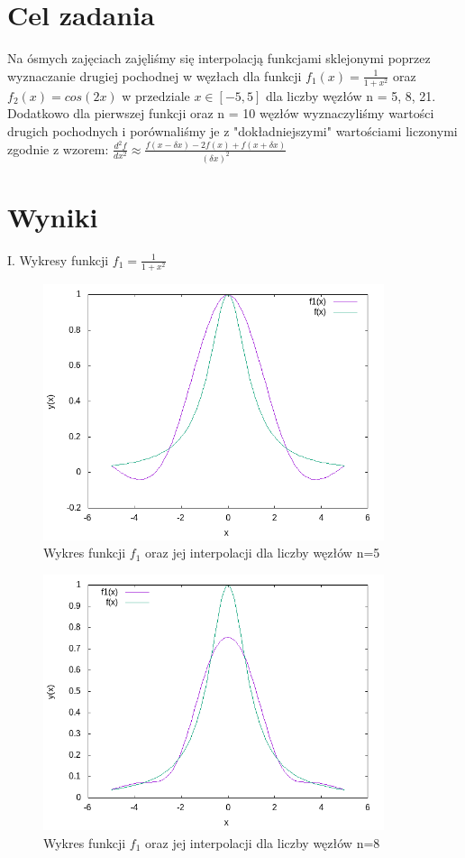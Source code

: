 \documentclass{article}
\begin{document}
\section{Cel zadania}
Na ósmych zajęciach zajęliśmy się interpolacją funkcjami sklejonymi poprzez wyznaczanie drugiej pochodnej w węzłach dla funkcji $f_1(x)=\frac{1}{1+x^2}$ oraz $f_2(x)=cos(2x)$ w przedziale $x\in[-5,5]$ dla liczby węzłów n = 5, 8, 21. Dodatkowo dla pierwszej funkcji oraz n = 10 węzłów wyznaczyliśmy wartości drugich pochodnych i porównaliśmy je z "dokładniejszymi" wartościami liczonymi zgodnie z wzorem: $\frac{d^2f}{dx^2}\approx \frac{f(x-\delta x)-2f(x)+f(x+\delta x)}{(\delta x)^2}$

\newpage
\section{Wyniki}
I. Wykresy funkcji $f_1=\frac{1}{1+x^2}$
\begin{figure}[h!]
\centering
\includegraphics[width=10cm]{f1_5.png}
\caption{Wykres funkcji $f_1$ oraz jej interpolacji dla liczby węzłów n=5}
\label{fig:obrazek f1_5}
\end{figure}

\begin{figure}[h!]
\centering
\includegraphics[width=10cm]{f1_8.png}
\caption{Wykres funkcji $f_1$ oraz jej interpolacji dla liczby węzłów n=8}
\label{fig:obrazek f1_8}
\end{figure}
\end{document}
